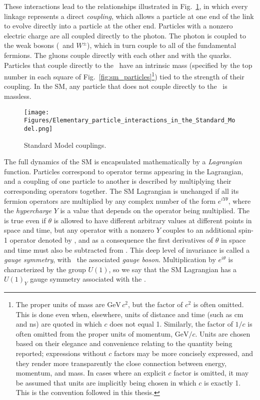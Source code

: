 These interactions lead to the relationships illustrated in Fig.~\ref{fig:sm_interactions}, in which every linkage represents
a direct \textit{coupling}, which allows a particle at one end of the link to evolve directly into a particle at the other end.
Particles with a nonzero electric charge are all coupled directly to the photon. The photon is coupled to the weak bosons
(\PZ\ and $W^\pm$), which in turn couple to all of the fundamental fermions. The gluons couple directly with each other and with the quarks.
Particles that couple directly to the \PH\ have an intrinsic mass (specified by the top number in each square of Fig.~\ref{fig:sm_particles}\footnote{The
proper units of mass are $\mathrm{GeV}\,c^{2}$, but the factor of $c^{2}$ is often omitted. This is done even when, elsewhere, units of distance and
time (such as cm and ns) are quoted in which $c$ does not equal 1. Similarly, the factor of $1/c$ is often omitted from the proper units of momentum,
$\mathrm{GeV}/c$. Units are chosen based on their elegance and convenience relating to the quantity being reported; expressions without $c$ factors
may be more concisely expressed, and they render more transparently the close connection between energy, momentum, and mass.
In cases where an explicit $c$ factor is omitted, it may be assumed that units are implicitly being chosen in which $c$ is exactly 1.
This is the convention followed in this thesis.}) tied to the strength of their coupling.
In the SM, any particle that does not couple directly to the \PH\ is massless.

\begin{figure}[hbtp]
  \begin{center}
    \texttt{[image: Figures/Elementary\_particle\_interactions\_in\_the\_Standard\_Model.png]}
    \caption{
      Standard Model couplings.
    }
    \label{fig:sm_interactions}
  \end{center}
\end{figure}

The full dynamics of the SM is encapsulated mathematically by a \textit{Lagrangian} function. Particles correspond to operator
terms appearing in the Lagrangian, and a coupling of one particle to another is described by multiplying their
corresponding operators together. The SM Lagrangian is unchanged
if all its fermion operators are multiplied by any complex number of the form $e^{iY\theta}$, where the \textit{hypercharge} $Y$ is a value that depends
on the operator being multiplied. The is true even if $\theta$ is allowed to have different arbitrary values at
different points in space and time, but any operator with a nonzero $Y$ couples to an additional spin-1 operator denoted by \PB,
and as a consequence the first derivatives of $\theta$ in space and time must also be subtracted from \PB.
This deep level of invariance is called a \textit{gauge symmetry}, with \PB\ the associated \textit{gauge boson}.
Multiplication by $e^{i\theta}$ is characterized by the group $U(1)$, so we say that the SM Lagrangian has a
$U(1)_{Y}$ gauge symmetry associated with the \PB.

